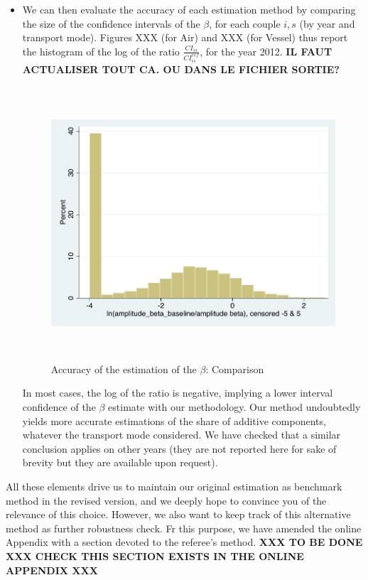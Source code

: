 \documentclass[a4paper,11pt]{article}
\begin{document}
\begin{itemize}
\begin{itemize}
    \item We can then evaluate the accuracy of each estimation method by comparing the size of the confidence intervals of the $\beta$, for each couple $i,s$ (by year and transport mode). Figures XXX (for Air) and XXX (for Vessel) thus report the histogram of the log of the ratio $\frac{CI_{is}}{CI^{ref}_{is}}$, for the year 2012. \textbf{IL FAUT ACTUALISER TOUT CA. OU DANS LE FICHIER SORTIE?}


\begin{figure}[htbp]
\caption{Accuracy of the estimation of the $\beta$: Comparison}
\label{fig:accuracy_beta}
\begin{center}
\includegraphics[height=4in]{accuracy_beta.pdf}
\end{center}
\end{figure}

In most cases, the log of the ratio is negative, implying a lower interval confidence of the $\beta$ estimate with our methodology. Our method undoubtedly yields more accurate estimations of the share of additive components, whatever the transport mode considered. We have checked that a similar conclusion applies on other years (they are not reported here for sake of brevity but they are available upon request).

\end{itemize}
\end{itemize}

All these elements drive us to maintain our original estimation as benchmark method in the revised version, and we deeply hope to convince you of the relevance of this choice. However, we also want to keep track of this alternative method as further robustness check. Fr this purpose, we have amended the online Appendix with a section devoted to the referee's method.\textbf{ XXX TO BE DONE XXX CHECK THIS SECTION EXISTS IN THE ONLINE APPENDIX XXX}
\end{document}
